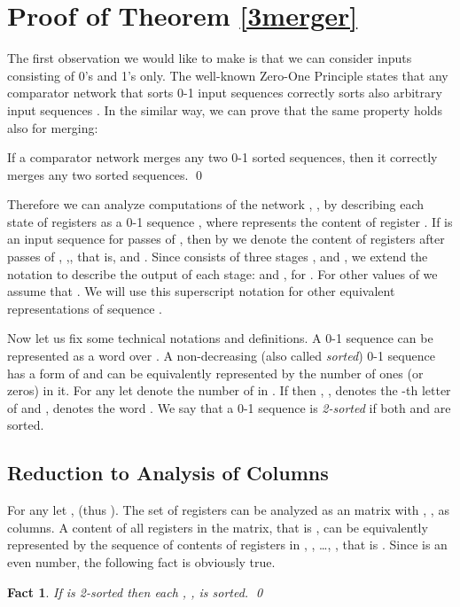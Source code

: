 \documentclass{llncs}
\newtheorem{fact}[theorem]{Fact}
\begin{document}
\section{Proof of Theorem \ref{3merger}}  

The first observation we would like to make is that we can consider
inputs consisting of 0's and 1's only. The well-known Zero-One Principle
states that any comparator network that sorts 0-1 input sequences
correctly sorts also arbitrary input sequences \cite{k}.  In the similar
way, we can prove that the same property holds also for merging:
\begin{proposition}
If a comparator network merges any two 0-1 sorted sequences, then it
correctly merges any two sorted sequences. \qed
\end{proposition} 

Therefore we can analyze computations of the network , , by
describing each state of registers as a 0-1 sequence , where  represents the content of register
. If  is an input sequence for  passes of ,
then by  we denote the content of registers after 
passes of , ,, that is,
 and . Since  consists of three stages ,
 and , we extend the notation to describe the output of each
stage:  and
, for
. For other values of  we assume that . We will use this superscript
notation for other equivalent representations of sequence
. 

Now let us fix some technical notations and definitions. A 0-1
sequence can be represented as a word over . A
non-decreasing (also called {\em sorted}) 0-1 sequence has a form of
 and can be equivalently represented by the number of ones (or
zeros) in it. For any  let  denote the number
of  in .  If  then , , denotes
the -th letter of  and ,  denotes the word . We say
that a 0-1 sequence  is {\em
  2-sorted} if both  and
 are sorted.

\subsection{Reduction to Analysis of Columns}

For any  let ,  (thus ). The set of registers  can be analyzed as an
 matrix with ,
, as columns. A content of all registers in the matrix,
that is , can be equivalently represented by the
sequence of contents of registers in , , \ldots, ,
that is .  Since  is an even
number, the following fact is obviously true.
\begin{fact} If  is 2-sorted then each ,
  , is sorted. \qed
\end{fact}
\end{document}
